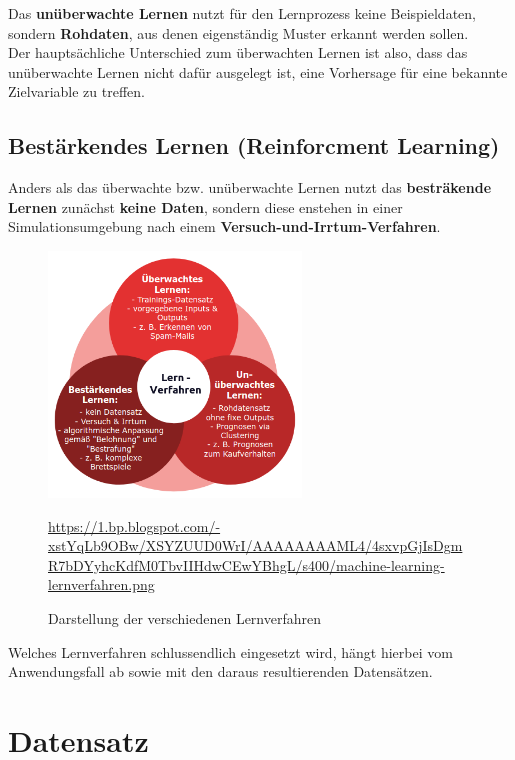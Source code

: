 	Das \textbf{unüberwachte Lernen} nutzt für den Lernprozess keine Beispieldaten, sondern \textbf{Rohdaten}, aus denen eigenständig Muster erkannt werden sollen. \\
	Der hauptsächliche Unterschied zum überwachten Lernen ist also, dass das unüberwachte Lernen nicht dafür ausgelegt ist, eine Vorhersage für eine bekannte Zielvariable zu treffen. \cite{datasolut3}
	
\subsection{Bestärkendes Lernen (Reinforcment Learning)}

	Anders als das überwachte bzw. unüberwachte Lernen nutzt das \textbf{besträkende Lernen} zunächst \textbf{keine Daten}, sondern diese enstehen in einer Simulationsumgebung nach einem \textbf{Versuch-und-Irrtum-Verfahren}. \cite{der-onliner_blogspot}
	
\begin{figure}[H]
	\centering
	\includegraphics[width=0.6\textwidth]{kapitel3/images/lernverfahren.png}
	\label{fig:machine-learning-algorithms}
	\caption{Darstellung der verschiedenen Lernverfahren}
	\vspace{0.2cm}
	\quelle\url{https://1.bp.blogspot.com/-xstYqLb9OBw/XSYZUUD0WrI/AAAAAAAAML4/4sxvpGjIsDgmR7bDYyhcKdfM0TbvIIHdwCEwYBhgL/s400/machine-learning-lernverfahren.png}
\end{figure}

Welches Lernverfahren schlussendlich eingesetzt wird, hängt hierbei vom Anwendungsfall ab sowie mit den daraus resultierenden Datensätzen.

\section{Datensatz}

